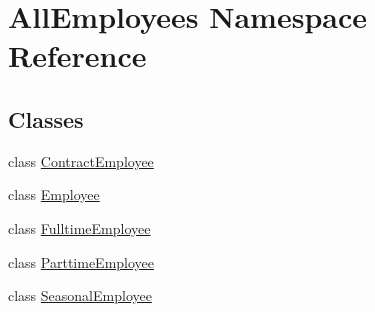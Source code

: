 \hypertarget{namespace_all_employees}{}\section{All\+Employees Namespace Reference}
\label{namespace_all_employees}
\subsection*{Classes}
\begin{DoxyCompactItemize}
\item 
class \hyperlink{class_all_employees_1_1_contract_employee}{Contract\+Employee}
\item 
class \hyperlink{class_all_employees_1_1_employee}{Employee}
\item 
class \hyperlink{class_all_employees_1_1_fulltime_employee}{Fulltime\+Employee}
\item 
class \hyperlink{class_all_employees_1_1_parttime_employee}{Parttime\+Employee}
\item 
class \hyperlink{class_all_employees_1_1_seasonal_employee}{Seasonal\+Employee}
\end{DoxyCompactItemize}
